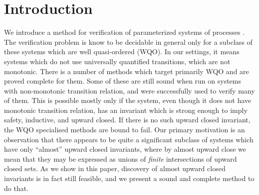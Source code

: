 \section{Introduction}\label{section:introduction}

We introduce a method for verification of parameterized systems of processes .
The verification problem is know to be decidable in general only for a subclass of these systems which are well quasi-ordered (WQO). In our settings, it means systems which do not use universally quantified transitions, which are not monotonic. There is a number of methods which target primarily WQO and are proved complete for them. Some of these are still sound when run on systems with non-monotonic transition relation, and were successfully used to verify many of them. This is possible mostly only if the system, even though it does not have monotonic transition relation, has an invariant which is strong enough to imply safety, inductive, and upward closed. If there is no such upward closed invariant, the WQO specialised methods are bound to fail.
Our primary motivation is an observation that there appears to be quite a significant subclass of systems which have only ``almost'' upward closed invariants, where by almost upward close we mean that 
they may be expressed as unions of \emph{finite} intersections of upward closed sets.
As we show in this paper, discovery of almost upward closed invariants is in fact still feasible, and we present a sound and complete method to do that.

